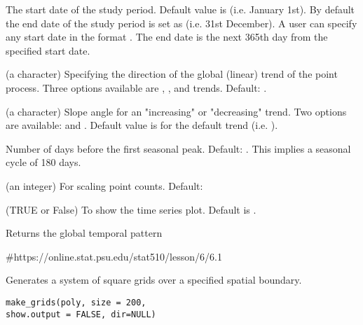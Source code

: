 \documentclass[a4paper]{book}
\begin{document}
\begin{Arguments}
\begin{ldescription}
\item[\code{start\_date}] The start date of the study period.
Default value is  (i.e. January 1st). By default
the end date of the study period is set as  (i.e.
31st December). A user can specify any start date in the
format . The end date is the next 365th day
from the specified start date.

\item[\code{trend}] (a character) Specifying the direction of
the global (linear) trend of the point process. Three options
available are , ,
and  trends. Default: .

\item[\code{slope}] (a character) Slope angle for an
"increasing" or "decreasing" trend. Two options
are available:  and .
Default value is  for the default trend
(i.e. ).

\item[\code{first\_s\_peak}] Number of days before the first seasonal
peak. Default: . This implies a seasonal cycle
of 180 days.

\item[\code{scale}] (an integer) For scaling point counts. Default: 

\item[\code{show.plot}] (TRUE or False) To show the time series
plot. Default is .
\end{ldescription}
\end{Arguments}
%
\begin{Value}
Returns the global temporal pattern
\end{Value}
%
\begin{References}\relax
\#https://online.stat.psu.edu/stat510/lesson/6/6.1
\end{References}
%
\begin{Description}\relax
Generates a system of square grids over a specified
spatial boundary.
\end{Description}
%
\begin{Usage}
\begin{verbatim}
make_grids(poly, size = 200,
show.output = FALSE, dir=NULL)
\end{verbatim}
\end{Usage}
\end{document}
